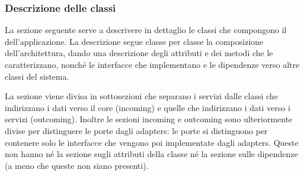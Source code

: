 \subsubsection{Descrizione delle classi}

\par La sezione seguente serve a descrivere in dettaglio le classi che compongono il  dell'applicazione. La descrizione segue classe per classe la composizione dell'architettura, dando una descrizione degli attributi e dei metodi che le caratterizzano, nonché le interfacce che implementano e le dipendenze verso altre classi del sistema.
\par La sezione viene divisa in sottosezioni che separano i servizi dalle classi che indirizzano i dati verso il core (incoming) e quelle che indirizzano i dati verso i servizi (outcoming). Inoltre le sezioni incoming e outcoming sono ulteriormente divise per distinguere le porte dagli adapters: le porte si distinguono per contenere solo le interfacce che vengono poi implementate dagli adapters. Queste non hanno né la sezione sugli attributi della classe né la sezione sulle dipendenze (a meno che queste non siano presenti). 



